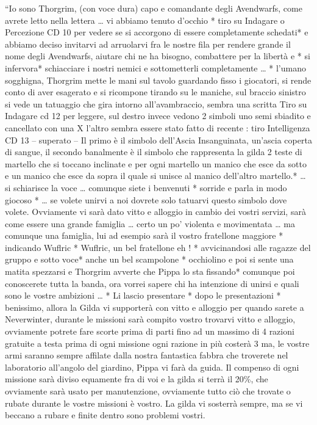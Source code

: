 \documentclass{article}
\begin{document}
“Io sono Thorgrim, (con voce dura) capo e comandante degli Avendwarfs, come avrete letto nella lettera … vi abbiamo tenuto d’occhio * tiro su Indagare o Percezione CD 10 per vedere se si accorgono di essere completamente schedati*  e abbiamo deciso invitarvi ad arruolarvi fra le nostre fila per rendere grande il nome degli Avendwarfs, aiutare chi ne ha bisogno, combattere per la libertà e * si infervora* schiacciare i nostri nemici e sottometterli completamente … * l’umano sogghigna, Thorgrim mette le mani sul tavolo guardando fisso i giocatori, si rende conto di aver esagerato e si ricompone tirando su le maniche, sul braccio sinistro si vede un tatuaggio che gira intorno all’avambraccio, sembra una scritta Tiro su Indagare cd 12 per leggere, sul destro invece vedono 2 simboli uno semi sbiadito e cancellato con una X l’altro sembra essere stato fatto di recente : tiro Intelligenza CD 13 – superato – Il primo è il simbolo dell’Ascia Insanguinata, un’ascia coperta di sangue, il secondo banalmente è il simbolo che rappresenta la gilda 2 teste di martello che si toccano inclinate e per ogni martello un manico che esce da sotto e  un manico che esce da sopra il quale si unisce al manico dell’altro martello.*  … si schiarisce la voce …  comunque siete i benvenuti * sorride e parla in modo giocoso * … se volete unirvi a noi dovrete solo tatuarvi questo simbolo dove volete. Ovviamente vi sarà dato vitto e alloggio in cambio dei vostri servizi, sarà come essere una grande famiglia … certo un po' violenta e movimentata … ma comunque una famiglia, lui ad esempio sarà il vostro fratellone maggiore * indicando Wuflric * Wuflric, un bel fratellone eh ! * avvicinandosi alle ragazze del gruppo e sotto voce* anche un bel scampolone * occhiolino e poi si sente una matita spezzarsi e Thorgrim avverte che Pippa lo sta fissando* comunque poi conoscerete tutta la banda, ora vorrei sapere chi ha intenzione di unirsi e quali sono le vostre ambizioni … * Li lascio presentare * dopo le presentazioni * benissimo, allora la Gilda vi supporterà con vitto e alloggio per quando sarete a Neverwinter, durante le missioni sarà compito vostro trovarvi vitto e alloggio, ovviamente potrete fare scorte prima di parti fino ad un massimo di 4 razioni gratuite a testa prima di ogni missione ogni razione in più costerà 3 ma, le vostre armi saranno sempre affilate dalla nostra fantastica fabbra che troverete nel laboratorio all’angolo del giardino, Pippa vi farà da guida. Il compenso di ogni missione sarà diviso equamente fra di voi e la gilda si terrà il 20\%, che ovviamente sarà usato per manutenzione, ovviamente tutto ciò che trovate o rubate durante le vostre missioni è vostro. La gilda vi sosterrà sempre, ma se vi beccano a rubare e finite dentro sono problemi vostri.
\end{document}
